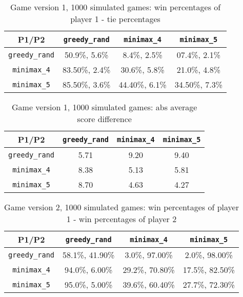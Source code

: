 \documentclass[conference]{IEEEtran}
\begin{document}
\begin{table}[hbt!]
\begin{center}
\begin{tabular}{|c||c|c|c|}
    \hline
    P1/P2 &  \verb|greedy_rand| & \verb|minimax_4| & \verb|minimax_5|\\
    \hline \hline
    \verb|greedy_rand| & 50.9\%, 5.6\%  & 8.4\%, 2.5\% & 07.4\%, 2.1\%\\ 
    \hline
    \verb|minimax_4|  & 83.50\%, 2.4\%  & 30.6\%, 5.8\% & 21.0\%,  4.8\%\\ 
    \hline
    \verb|minimax_5|  & 85.50\%, 3.6\% & 44.40\%, 6.1\% & 34.50\%, 7.3\%\\ 
    
    \hline
\end{tabular}
\caption{Game version 1, 1000 simulated games: win percentages of player 1 - tie percentages}
\end{center}
\label{table:greedy_minimax_game1}
\end{table}


\begin{table}[hbt!]
\begin{center}
\begin{tabular}{|c||c|c|c|}
    \hline
    P1/P2 &  \verb|greedy_rand| & \verb|minimax_4| & \verb|minimax_5|\\
    \hline \hline
    \verb|greedy_rand| &  5.71 & 9.20 &  9.40\\ 
    \hline
    \verb|minimax_4|  &  8.38 &  5.13 &  5.81\\ 
    \hline
    \verb|minimax_5|  & 8.70&  4.63 &  4.27\\ 
    
    \hline
\end{tabular}
\caption{Game version 1, 1000 simulated games: abs average score difference}
\end{center}
\end{table}



\begin{table}[hbt!]
\begin{center}
\begin{tabular}{|c||c|c|c|}
    \hline
    P1/P2 &  \verb|greedy_rand| & \verb|minimax_4| & \verb|minimax_5|\\
    \hline \hline
   \verb|greedy_rand| & 58.1\%, 41.90\%  & 3.0\%, 97.00\% & 2.0\%, 98.00\%\\ 
    \hline
    \verb|minimax_4|  & 94.0\%, 6.00\%  & 29.2\%, 70.80\% & 17.5\%, 82.50\%\\ 
    \hline
    \verb|minimax_5| & 95.0\%, 5.00\% & 39.6\%, 60.40\% & 27.7\%, 72.30\%\\ 
    
    \hline
\end{tabular}
\caption{Game version 2, 1000 simulated games: win percentages of player 1 - win percentages of player 2}
\end{center}
\label{table:greedy_minimax_game2}
\end{table}
\end{document}
